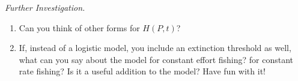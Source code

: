 \vfill

\emph{Further Investigation.}
\begin{enumerate}[label=\emph{\arabic*.}]
\item Can you think of other forms for $H(P,t)$? 

\item If, instead of a logistic model, you include an extinction threshold as well, what can you say about the model for constant effort fishing? for constant rate fishing? Is it a useful addition to the model? Have fun with it!
\end{enumerate}

\begin{noexercises}
\end{noexercises}
